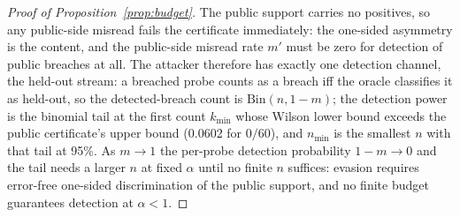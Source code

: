 \begin{proof}[Proof of Proposition~\ref{prop:budget}]
The public support carries no positives, so any public-side misread fails
the certificate immediately: the one-sided asymmetry is the content, and
the public-side misread rate $m'$ must be zero for detection of public
breaches at all. The attacker therefore has exactly one detection channel,
the held-out stream: a breached probe counts as a breach iff the oracle
classifies it as held-out, so the detected-breach count is
$\mathrm{Bin}(n,1-m)$; the detection power is the binomial tail at the
first count $k_{\min}$ whose Wilson lower bound exceeds the public
certificate's upper bound (0.0602 for $0/60$), and $n_{\min}$ is the
smallest $n$ with that tail at 95\%. As $m\to1$ the per-probe detection
probability $1-m\to0$ and the tail needs a larger $n$ at fixed $\alpha$
until no finite $n$ suffices: evasion requires error-free one-sided
discrimination of the public support, and no finite budget guarantees
detection at $\alpha<1$.
\end{proof}
